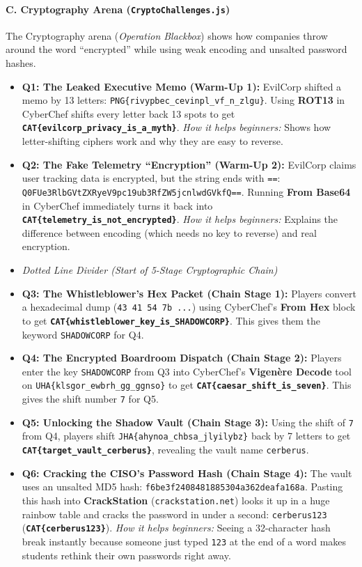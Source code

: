 \documentclass[11pt,a4paper]{article}
\begin{document}
\paragraph{C. Cryptography Arena (\texttt{CryptoChallenges.js})}
The Cryptography arena (\textit{Operation Blackbox}) shows how companies throw around the word ``encrypted'' while using weak encoding and unsalted password hashes.
\begin{itemize}
    \item \textbf{Q1: The Leaked Executive Memo (Warm-Up 1):} EvilCorp shifted a memo by 13 letters: \texttt{PNG\{rivypbec\_cevinpl\_vf\_n\_zlgu\}}. Using \textbf{ROT13} in CyberChef shifts every letter back 13 spots to get \textbf{\texttt{CAT\{evilcorp\_privacy\_is\_a\_myth\}}}. \textit{How it helps beginners:} Shows how letter-shifting ciphers work and why they are easy to reverse.
    \item \textbf{Q2: The Fake Telemetry ``Encryption'' (Warm-Up 2):} EvilCorp claims user tracking data is encrypted, but the string ends with \texttt{==}: \texttt{Q0FUe3RlbGVtZXRyeV9\allowbreak pc19ub3RfZW5jcnlwdGVkfQ==}. Running \textbf{From Base64} in CyberChef immediately turns it back into \textbf{\texttt{CAT\{telemetry\_\allowbreak is\_not\_encrypted\}}}. \textit{How it helps beginners:} Explains the difference between encoding (which needs no key to reverse) and real encryption.
    \item \textit{Dotted Line Divider (Start of 5-Stage Cryptographic Chain)}
    \item \textbf{Q3: The Whistleblower's Hex Packet (Chain Stage 1):} Players convert a hexadecimal dump (\texttt{43 41 54 7b ...}) using CyberChef's \textbf{From Hex} block to get \textbf{\texttt{CAT\{whistleblower\_\allowbreak key\_is\_SHADOWCORP\}}}. This gives them the keyword \texttt{SHADOWCORP} for Q4.
    \item \textbf{Q4: The Encrypted Boardroom Dispatch (Chain Stage 2):} Players enter the key \texttt{SHADOWCORP} from Q3 into CyberChef's \textbf{Vigen\`ere Decode} tool on \texttt{UHA\{klsgor\_ewbrh\_gg\_ggnso\}} to get \textbf{\texttt{CAT\{caesar\_shift\_is\_seven\}}}. This gives the shift number \texttt{7} for Q5.
    \item \textbf{Q5: Unlocking the Shadow Vault (Chain Stage 3):} Using the shift of \texttt{7} from Q4, players shift \texttt{JHA\{ahynoa\_chbsa\_jlyilybz\}} back by 7 letters to get \textbf{\texttt{CAT\{target\_vault\_cerberus\}}}, revealing the vault name \texttt{cerberus}.
    \item \textbf{Q6: Cracking the CISO's Password Hash (Chain Stage 4):} The vault uses an unsalted MD5 hash: \texttt{f6be3f2408481885304a362deafa168a}. Pasting this hash into \textbf{CrackStation} (\texttt{crackstation.net}) looks it up in a huge rainbow table and cracks the password in under a second: \texttt{cerberus123} (\textbf{\texttt{CAT\{cerberus123\}}}). \textit{How it helps beginners:} Seeing a 32-character hash break instantly because someone just typed \texttt{123} at the end of a word makes students rethink their own passwords right away.

\end{itemize}
\end{document}
